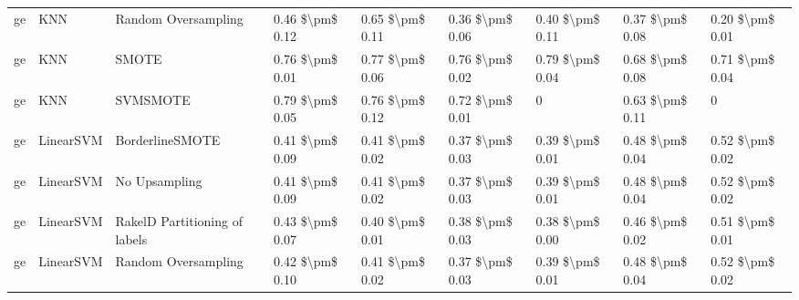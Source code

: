 \begin{tabular}{lllllllll}
      ge &                             KNN &           Random Oversampling &     0.46 \$\textbackslash pm\$ 0.12 &           0.65 \$\textbackslash pm\$ 0.11 &       0.36 \$\textbackslash pm\$ 0.06 &        0.40 \$\textbackslash pm\$ 0.11 &                         0.37 \$\textbackslash pm\$ 0.08 &     0.20 \$\textbackslash pm\$ 0.01 \\
      ge &                             KNN &                         SMOTE &     0.76 \$\textbackslash pm\$ 0.01 &           0.77 \$\textbackslash pm\$ 0.06 &       0.76 \$\textbackslash pm\$ 0.02 &        0.79 \$\textbackslash pm\$ 0.04 &                         0.68 \$\textbackslash pm\$ 0.08 &     0.71 \$\textbackslash pm\$ 0.04 \\
      ge &                             KNN &                      SVMSMOTE &     0.79 \$\textbackslash pm\$ 0.05 &           0.76 \$\textbackslash pm\$ 0.12 &       0.72 \$\textbackslash pm\$ 0.01 &                      0 &                         0.63 \$\textbackslash pm\$ 0.11 &                   0 \\
      ge &                       LinearSVM &               BorderlineSMOTE &     0.41 \$\textbackslash pm\$ 0.09 &           0.41 \$\textbackslash pm\$ 0.02 &       0.37 \$\textbackslash pm\$ 0.03 &        0.39 \$\textbackslash pm\$ 0.01 &                         0.48 \$\textbackslash pm\$ 0.04 &     0.52 \$\textbackslash pm\$ 0.02 \\
      ge &                       LinearSVM &                 No Upsampling &     0.41 \$\textbackslash pm\$ 0.09 &           0.41 \$\textbackslash pm\$ 0.02 &       0.37 \$\textbackslash pm\$ 0.03 &        0.39 \$\textbackslash pm\$ 0.01 &                         0.48 \$\textbackslash pm\$ 0.04 &     0.52 \$\textbackslash pm\$ 0.02 \\
      ge &                       LinearSVM & RakelD Partitioning of labels &     0.43 \$\textbackslash pm\$ 0.07 &           0.40 \$\textbackslash pm\$ 0.01 &       0.38 \$\textbackslash pm\$ 0.03 &        0.38 \$\textbackslash pm\$ 0.00 &                         0.46 \$\textbackslash pm\$ 0.02 &     0.51 \$\textbackslash pm\$ 0.01 \\
      ge &                       LinearSVM &           Random Oversampling &     0.42 \$\textbackslash pm\$ 0.10 &           0.41 \$\textbackslash pm\$ 0.02 &       0.37 \$\textbackslash pm\$ 0.03 &        0.39 \$\textbackslash pm\$ 0.01 &                         0.48 \$\textbackslash pm\$ 0.04 &     0.52 \$\textbackslash pm\$ 0.02 \\

\end{tabular}
